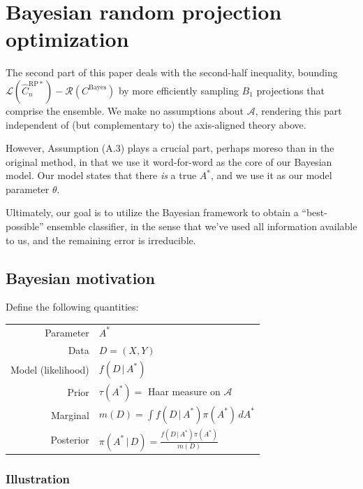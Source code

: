 \documentclass[ejs,preprint]{imsart}
\newcommand\cbayes{C^{\mathrm{Bayes}}}
\newcommand\crpnhatstar{\hat{C}_{n}^{\mathrm{RP*}}}
\newcommand\risk{\mathcal{L}}
\newcommand\rrisk{\mathcal{R}}
\begin{document}
\section{Bayesian random projection optimization}

The second part of this paper deals with the second-half inequality, bounding $\risk(\crpnhatstar) - \rrisk(\cbayes)$ by more efficiently sampling $B_1$ projections that comprise the ensemble. We make no assumptions about $\mathcal A$, rendering this part independent of (but complementary to) the axis-aligned theory above.

However, Assumption (A.3) plays a crucial part, perhaps moreso than in the original method, in that we use it word-for-word as the core of our Bayesian model. Our model states that there \emph{is} a true $A^*$, and we use it as our model parameter $\theta$.

Ultimately, our goal is to utilize the Bayesian framework to obtain a ``best-possible'' ensemble classifier, in the sense that we've used all information available to us, and the remaining error is irreducible.

\subsection{Bayesian motivation}

Define the following quantities:

\begin{center}
	\begin{tabular}{r|l}
		Parameter & $A^*$ \\
		Data & $D=(X,Y)$ \\
		Model (likelihood) & $f(D\,|\,A^*)$ \\
		Prior & $\tau(A^*)=$ Haar measure on $\mathcal{A}$ \\
		Marginal & $m(D) = \int\!f(D\,|\,A^*)\pi(A^*)\,dA^*$ \\
		Posterior & $\pi(A^*\,|\,D) = \frac{f(D\,|\,A^*)\pi(A^*)}{m(D)}$
	\end{tabular}
\end{center}

\subsubsection{Illustration}
\end{document}
